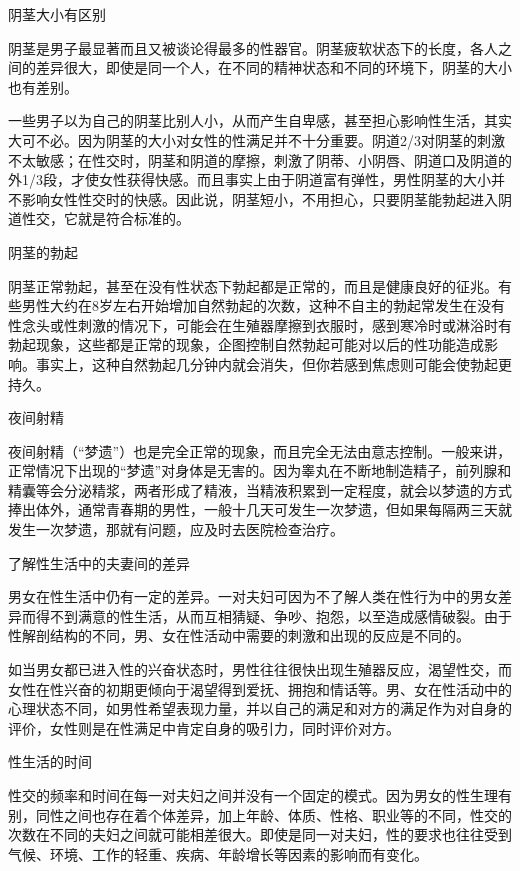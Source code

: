 \documentclass[12pt,UTF8]{ctexbook}
\begin{document}
阴茎大小有区别


阴茎是男子最显著而且又被谈论得最多的性器官。阴茎疲软状态下的长度，各人之间的差异很大，即使是同一个人，在不同的精神状态和不同的环境下，阴茎的大小也有差别。

一些男子以为自己的阴茎比别人小，从而产生自卑感，甚至担心影响性生活，其实大可不必。因为阴茎的大小对女性的性满足并不十分重要。阴道2/3对阴茎的刺激不太敏感；在性交时，阴茎和阴道的摩擦，刺激了阴蒂、小阴唇、阴道口及阴道的外1/3段，才使女性获得快感。而且事实上由于阴道富有弹性，男性阴茎的大小并不影响女性性交时的快感。因此说，阴茎短小，不用担心，只要阴茎能勃起进入阴道性交，它就是符合标准的。





阴茎的勃起


阴茎正常勃起，甚至在没有性状态下勃起都是正常的，而且是健康良好的征兆。有些男性大约在8岁左右开始增加自然勃起的次数，这种不自主的勃起常发生在没有性念头或性刺激的情况下，可能会在生殖器摩擦到衣服时，感到寒冷时或淋浴时有勃起现象，这些都是正常的现象，企图控制自然勃起可能对以后的性功能造成影响。事实上，这种自然勃起几分钟内就会消失，但你若感到焦虑则可能会使勃起更持久。





夜间射精


夜间射精（“梦遗”）也是完全正常的现象，而且完全无法由意志控制。一般来讲，正常情况下出现的“梦遗”对身体是无害的。因为睾丸在不断地制造精子，前列腺和精囊等会分泌精浆，两者形成了精液，当精液积累到一定程度，就会以梦遗的方式捧出体外，通常青春期的男性，一般十几天可发生一次梦遗，但如果每隔两三天就发生一次梦遗，那就有问题，应及时去医院检查治疗。





了解性生活中的夫妻间的差异


男女在性生活中仍有一定的差异。一对夫妇可因为不了解人类在性行为中的男女差异而得不到满意的性生活，从而互相猜疑、争吵、抱怨，以至造成感情破裂。由于性解剖结构的不同，男、女在性活动中需要的刺激和出现的反应是不同的。

如当男女都已进入性的兴奋状态时，男性往往很快出现生殖器反应，渴望性交，而女性在性兴奋的初期更倾向于渴望得到爱抚、拥抱和情话等。男、女在性活动中的心理状态不同，如男性希望表现力量，并以自己的满足和对方的满足作为对自身的评价，女性则是在性满足中肯定自身的吸引力，同时评价对方。





性生活的时间


性交的频率和时间在每一对夫妇之间并没有一个固定的模式。因为男女的性生理有别，同性之间也存在着个体差异，加上年龄、体质、性格、职业等的不同，性交的次数在不同的夫妇之间就可能相差很大。即使是同一对夫妇，性的要求也往往受到气候、环境、工作的轻重、疾病、年龄增长等因素的影响而有变化。
\end{document}

